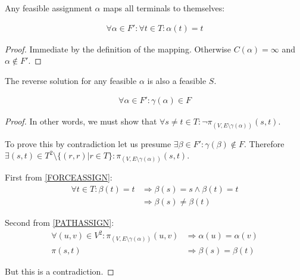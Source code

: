 \documentclass{article}
\begin{document}
\begin{lemma}
\label{FORCEASSIGN}
Any feasible assignment $\alpha$ maps all terminals to themselves:

\begin{align}
	\nonumber \forall \alpha \in F' : \forall t \in T : \alpha(t) = t
\end{align}
\end{lemma}
\begin{proof}
Immediate by the definition of the mapping.
Otherwise $C(\alpha) = \infty$ and $\alpha \not\in F'$.
\end{proof}

\begin{lemma}
\label{REVERSEFEASABLE}
The reverse solution for any feasible $\alpha$ is also a feasible $S$.

\begin{align}
	\nonumber \forall \alpha \in F' : \gamma(\alpha) \in F
\end{align}
\end{lemma}
\begin{proof}
In other words, we must show that $\forall s \neq t \in T : \neg\pi_{(V, E \setminus \gamma(\alpha))}(s, t)$.

To prove this by contradiction let us presume $\exists \beta \in F' : \gamma(\beta) \not\in F$.
Therefore $\exists (s, t) \in T^2 \setminus \{(r,r) | r \in T\} : \pi_{(V, E \setminus \gamma(\alpha))}(s, t)$.

First from \ref{FORCEASSIGN}:
\begin{align}
	\nonumber \forall t \in T : \beta(t) = t & \Rightarrow \beta(s) = s \wedge \beta(t) = t \\
	\nonumber & \Rightarrow \beta(s) \neq \beta(t)
\end{align}

Second from \ref{PATHASSIGN}:
\begin{align}
	\nonumber \forall (u, v) \in V^2 : \pi_{(V, E \setminus \gamma(\alpha))}(u,v) & \Rightarrow \alpha(u) = \alpha(v) \\
	\nonumber \pi(s, t) & \Rightarrow \beta(s) = \beta(t)
\end{align}

But this is a contradiction.
\end{proof}
\end{document}
